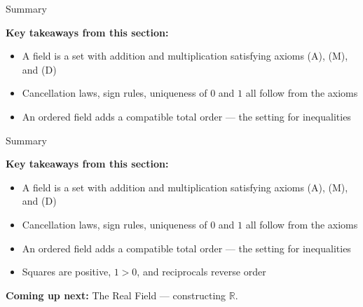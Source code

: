 \documentclass[aspectratio=169,12pt,t]{beamer}
\begin{document}
{%
\begin{frame}{Summary}
  \begin{hlbox}
    \textbf{Key takeaways from this section:}
    \begin{itemize}
      \item A \alert{field} is a set with addition and multiplication satisfying axioms (A), (M), and (D)
      \item Cancellation laws, sign rules, uniqueness of $0$ and $1$ all follow from the axioms
      \item An \alert{ordered field} adds a compatible total order --- the setting for inequalities
    \end{itemize}
  \end{hlbox}

\end{frame}

\begin{frame}{Summary}
  \begin{hlbox}
    \textbf{Key takeaways from this section:}
    \begin{itemize}
      \item A \alert{field} is a set with addition and multiplication satisfying axioms (A), (M), and (D)
      \item Cancellation laws, sign rules, uniqueness of $0$ and $1$ all follow from the axioms
      \item An \alert{ordered field} adds a compatible total order --- the setting for inequalities
      \item Squares are positive, $1 > 0$, and reciprocals reverse order
    \end{itemize}
  \end{hlbox}

  \vspace{1em}
  \begin{hlbox}
  \textbf{Coming up next:} The Real Field --- constructing $\mathbb{R}$.
  \end{hlbox}

\end{frame}
}
\end{document}
